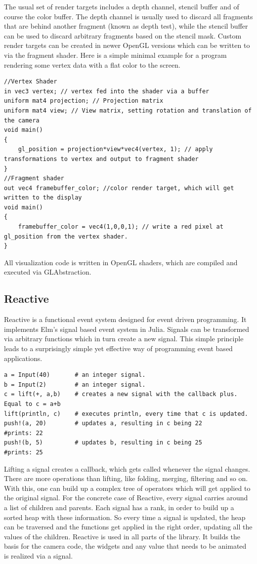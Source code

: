 The usual set of render targets includes a depth channel, stencil buffer and of course the color buffer.
The depth channel is usually used to discard all fragments that are behind another fragment (known as depth test), while the stencil buffer can be used to discard arbitrary fragments based on the stencil mask. 
Custom render targets can be created in newer OpenGL versions which can be written to via the fragment shader.
Here is a simple minimal example for a program rendering some vertex data with a flat color to the screen.

\begin{lstlisting}
//Vertex Shader
in vec3 vertex; // vertex fed into the shader via a buffer
uniform mat4 projection; // Projection matrix
uniform mat4 view; // View matrix, setting rotation and translation of the camera
void main()
{
    gl_position = projection*view*vec4(vertex, 1); // apply transformations to vertex and output to fragment shader
}
//Fragment shader
out vec4 framebuffer_color; //color render target, which will get written to the display
void main()
{
    framebuffer_color = vec4(1,0,0,1); // write a red pixel at gl_position from the vertex shader.
}
\end{lstlisting}

All visualization code is written in OpenGL shaders, which are compiled and executed via GLAbstraction.

\subsection{Reactive}
Reactive\cite{Reactive} is a functional event system designed for event driven programming.
It implements Elm's\cite{Elm} signal based event system in Julia.
Signals can be transformed via arbitrary functions which in turn create a new signal.
This simple principle leads to a surprisingly simple yet effective way of programming event based applications.

\begin{lstlisting}
a = Input(40)       # an integer signal.
b = Input(2)        # an integer signal.
c = lift(+, a,b)    # creates a new signal with the callback plus. Equal to c = a+b
lift(println, c)    # executes println, every time that c is updated. 
push!(a, 20)        # updates a, resulting in c being 22
#prints: 22
push!(b, 5)         # updates b, resulting in c being 25
#prints: 25
\end{lstlisting}

Lifting a signal creates a callback, which gets called whenever the signal changes.
There are more operations than lifting, like folding, merging, filtering and so on.
With this, one can build up a complex tree of operators which will get applied to the original signal.
For the concrete case of Reactive, every signal carries around a list of children and parents.
Each signal has a rank, in order to build up a sorted heap with these information.
So every time a signal is updated, the heap can be traversed and the functions get applied in the right order, updating all the values of the children.
Reactive is used in all parts of the library. It builds the basis for the camera code, the widgets and any value that needs to be animated is realized via a signal.

